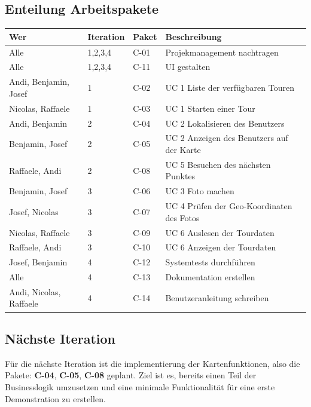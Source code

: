 \documentclass[a4paper,10pt,xetex]{article}
\begin{document}
\subsection{Enteilung Arbeitspakete}\label{enteilung-arbeitspakete}
\begin{longtabu} to \textwidth { | l | l | l | X[l] | }
\hline
\textbf{Wer} & \textbf{Iteration} & \textbf{Paket} & \textbf{Beschreibung} \\\hline
\endhead

Alle                         & 1,2,3,4 & C-01 & Projekmanagement nachtragen \\\hline
Alle                         & 1,2,3,4 & C-11 & UI gestalten \\\hline
Andi, Benjamin, Josef        & 1       & C-02 & UC 1 Liste der verfügbaren Touren \\\hline
Nicolas, Raffaele            & 1       & C-03 & UC 1 Starten einer Tour \\\hline
Andi, Benjamin               & 2       & C-04 & UC 2 Lokalisieren des Benutzers \\\hline
Benjamin, Josef              & 2       & C-05 & UC 2 Anzeigen des Benutzers auf der Karte \\\hline
Raffaele, Andi               & 2       & C-08 & UC 5 Besuchen des nächsten Punktes \\\hline
Benjamin, Josef              & 3       & C-06 & UC 3 Foto machen \\\hline
Josef, Nicolas               & 3       & C-07 & UC 4 Prüfen der Geo-Koordinaten des Fotos \\\hline
Nicolas, Raffaele            & 3       & C-09 & UC 6 Auslesen der Tourdaten \\\hline
Raffaele, Andi               & 3       & C-10 & UC 6 Anzeigen der Tourdaten \\\hline
Josef, Benjamin              & 4       & C-12 & Systemtests durchführen \\\hline
Alle                         & 4       & C-13 & Dokumentation erstellen \\\hline
Andi, Nicolas, Raffaele      & 4       & C-14 & Benutzeranleitung schreiben \\\hline
\end{longtabu}


\subsection{Nächste Iteration}\label{naechste-iteration}
Für die nächste Iteration ist die implementierung der Kartenfunktionen, also die Pakete: \textbf{C-04}, \textbf{C-05}, \textbf{C-08} geplant.
Ziel ist es, bereits einen Teil der Businesslogik umzusetzen und eine minimale Funktionalität für eine erste Demonstration zu erstellen.
\end{document}
